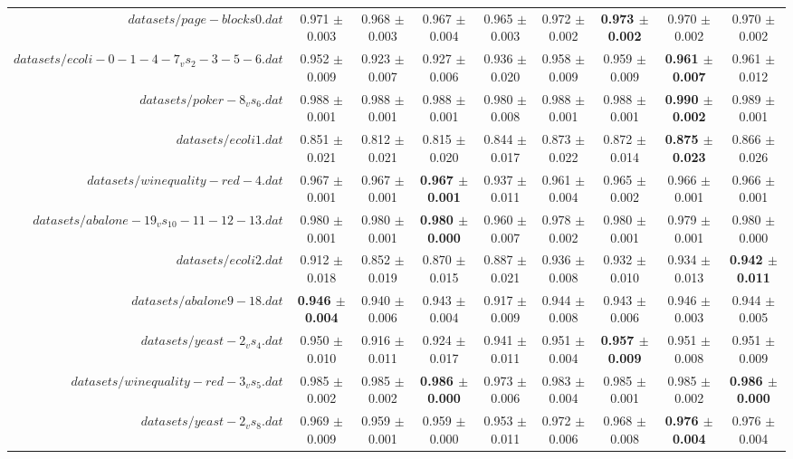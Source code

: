 \begin{table}[!ht]
{\begin{tabular}{r c c c c c c c c}
$datasets/page-blocks0.dat$ & 0.971 $\pm$ 0.003 & 0.968 $\pm$ 0.003 & 0.967 $\pm$ 0.004 & 0.965 $\pm$ 0.003 & 0.972 $\pm$ 0.002 & \textbf{0.973 $\pm$ 0.002} & 0.970 $\pm$ 0.002 & 0.970 $\pm$ 0.002 \\
$datasets/ecoli-0-1-4-7_vs_2-3-5-6.dat$ & 0.952 $\pm$ 0.009 & 0.923 $\pm$ 0.007 & 0.927 $\pm$ 0.006 & 0.936 $\pm$ 0.020 & 0.958 $\pm$ 0.009 & 0.959 $\pm$ 0.009 & \textbf{0.961 $\pm$ 0.007} & 0.961 $\pm$ 0.012 \\
$datasets/poker-8_vs_6.dat$ & 0.988 $\pm$ 0.001 & 0.988 $\pm$ 0.001 & 0.988 $\pm$ 0.001 & 0.980 $\pm$ 0.008 & 0.988 $\pm$ 0.001 & 0.988 $\pm$ 0.001 & \textbf{0.990 $\pm$ 0.002} & 0.989 $\pm$ 0.001 \\
$datasets/ecoli1.dat$ & 0.851 $\pm$ 0.021 & 0.812 $\pm$ 0.021 & 0.815 $\pm$ 0.020 & 0.844 $\pm$ 0.017 & 0.873 $\pm$ 0.022 & 0.872 $\pm$ 0.014 & \textbf{0.875 $\pm$ 0.023} & 0.866 $\pm$ 0.026 \\
$datasets/winequality-red-4.dat$ & 0.967 $\pm$ 0.001 & 0.967 $\pm$ 0.001 & \textbf{0.967 $\pm$ 0.001} & 0.937 $\pm$ 0.011 & 0.961 $\pm$ 0.004 & 0.965 $\pm$ 0.002 & 0.966 $\pm$ 0.001 & 0.966 $\pm$ 0.001 \\
$datasets/abalone-19_vs_10-11-12-13.dat$ & 0.980 $\pm$ 0.001 & 0.980 $\pm$ 0.001 & \textbf{0.980 $\pm$ 0.000} & 0.960 $\pm$ 0.007 & 0.978 $\pm$ 0.002 & 0.980 $\pm$ 0.001 & 0.979 $\pm$ 0.001 & 0.980 $\pm$ 0.000 \\
$datasets/ecoli2.dat$ & 0.912 $\pm$ 0.018 & 0.852 $\pm$ 0.019 & 0.870 $\pm$ 0.015 & 0.887 $\pm$ 0.021 & 0.936 $\pm$ 0.008 & 0.932 $\pm$ 0.010 & 0.934 $\pm$ 0.013 & \textbf{0.942 $\pm$ 0.011} \\
$datasets/abalone9-18.dat$ & \textbf{0.946 $\pm$ 0.004} & 0.940 $\pm$ 0.006 & 0.943 $\pm$ 0.004 & 0.917 $\pm$ 0.009 & 0.944 $\pm$ 0.008 & 0.943 $\pm$ 0.006 & 0.946 $\pm$ 0.003 & 0.944 $\pm$ 0.005 \\
$datasets/yeast-2_vs_4.dat$ & 0.950 $\pm$ 0.010 & 0.916 $\pm$ 0.011 & 0.924 $\pm$ 0.017 & 0.941 $\pm$ 0.011 & 0.951 $\pm$ 0.004 & \textbf{0.957 $\pm$ 0.009} & 0.951 $\pm$ 0.008 & 0.951 $\pm$ 0.009 \\
$datasets/winequality-red-3_vs_5.dat$ & 0.985 $\pm$ 0.002 & 0.985 $\pm$ 0.002 & \textbf{0.986 $\pm$ 0.000} & 0.973 $\pm$ 0.006 & 0.983 $\pm$ 0.004 & 0.985 $\pm$ 0.001 & 0.985 $\pm$ 0.002 & \textbf{0.986 $\pm$ 0.000} \\
$datasets/yeast-2_vs_8.dat$ & 0.969 $\pm$ 0.009 & 0.959 $\pm$ 0.001 & 0.959 $\pm$ 0.000 & 0.953 $\pm$ 0.011 & 0.972 $\pm$ 0.006 & 0.968 $\pm$ 0.008 & \textbf{0.976 $\pm$ 0.004} & 0.976 $\pm$ 0.004 \\

\end{tabular}}
\end{table}
